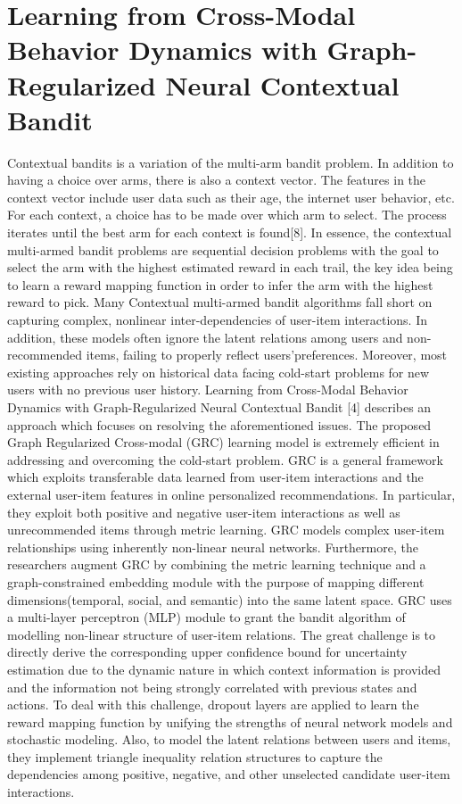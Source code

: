 \section {Learning from Cross-Modal Behavior Dynamics with
Graph-Regularized Neural Contextual Bandit}

Contextual bandits is a variation of the multi-arm bandit problem. In addition to having a choice over arms, there is also a context vector. The features in the context vector include user data such as their age, the internet user behavior, etc. For each context, a choice has to be made over which arm to select. The process iterates until the best arm for each context is found[8]. In essence, the contextual multi-armed bandit problems are sequential decision problems with the goal to select the arm with the highest estimated reward in each trail, the key idea being to learn a reward mapping function in order to infer the arm with the highest reward to pick. Many Contextual multi-armed bandit algorithms fall short on capturing complex, nonlinear inter-dependencies of user-item interactions. In addition, these models often ignore the latent relations among users and non-recommended items, failing to properly reflect users’preferences. Moreover, most existing approaches rely on historical data facing cold-start problems for new users with no previous user history. Learning from Cross-Modal Behavior Dynamics with Graph-Regularized Neural Contextual Bandit [4] describes an approach which focuses on resolving the aforementioned issues. The proposed Graph Regularized Cross-modal (GRC) learning model is extremely efficient in addressing and overcoming the cold-start problem. GRC is a general framework which exploits transferable data learned from user-item interactions and the external user-item features in online personalized recommendations. In particular, they exploit both positive and negative user-item interactions as well as unrecommended items through metric learning. GRC models complex user-item relationships using inherently non-linear neural networks. Furthermore, the researchers augment GRC by combining the metric learning technique and a graph-constrained embedding module with the purpose of mapping different dimensions(temporal, social, and semantic) into the same latent space. GRC uses a multi-layer perceptron (MLP) module to grant the bandit algorithm of modelling non-linear structure of user-item relations. The great challenge is to directly derive the corresponding upper confidence bound for uncertainty estimation due to the dynamic nature in which context information is provided and the information not being strongly correlated with previous states and actions. To deal with this challenge, dropout layers are applied to learn the reward mapping function by unifying the strengths of neural network models and stochastic modeling. Also, to model the latent relations between users and items, they implement triangle inequality relation structures to capture the dependencies among positive, negative, and other unselected candidate user-item interactions. 
